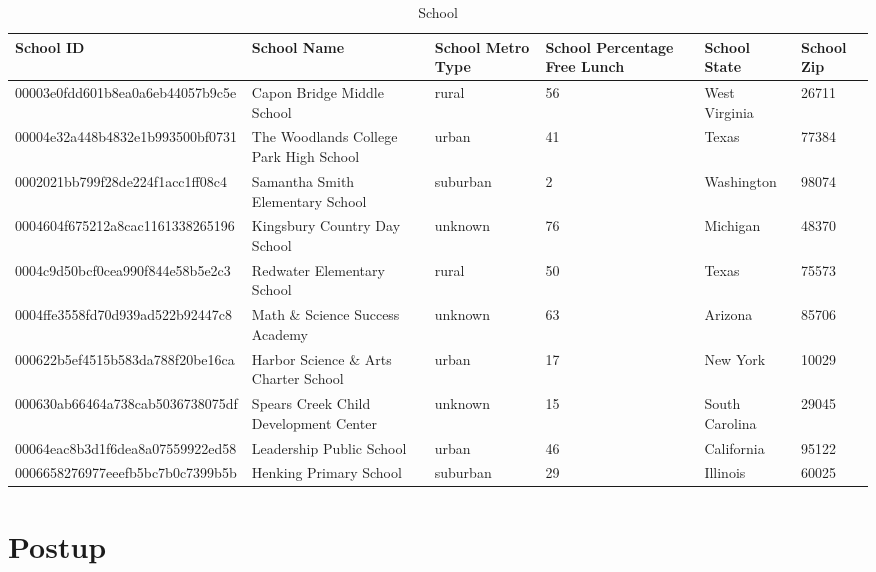 \documentclass[12pt,a4paper]{article}
\begin{document}
\begin{table}[htb]
\begin{tabularx}{1.05\textwidth}{XlXXXX}
School ID                        & School Name                            & School Metro Type & School Percentage Free Lunch & School State   & School Zip \\ \hline
00003e0fdd601b8ea0a6eb44057b9c5e & Capon Bridge Middle School             & rural             & 56                           & West Virginia  & 26711      \\
00004e32a448b4832e1b993500bf0731 & The Woodlands College Park High School & urban             & 41                           & Texas          & 77384      \\
0002021bb799f28de224f1acc1ff08c4 & Samantha Smith Elementary School       & suburban          & 2                            & Washington     & 98074      \\
0004604f675212a8cac1161338265196 & Kingsbury Country Day School           & unknown           & 76                           & Michigan       & 48370      \\
0004c9d50bcf0cea990f844e58b5e2c3 & Redwater Elementary School             & rural             & 50                           & Texas          & 75573      \\
0004ffe3558fd70d939ad522b92447c8 & Math \& Science Success Academy        & unknown           & 63                           & Arizona        & 85706      \\
000622b5ef4515b583da788f20be16ca & Harbor Science \& Arts Charter School  & urban             & 17                           & New York       & 10029      \\
000630ab66464a738cab5036738075df & Spears Creek Child Development Center  & unknown           & 15                           & South Carolina & 29045      \\
00064eac8b3d1f6dea8a07559922ed58 & Leadership Public School               & urban             & 46                           & California     & 95122      \\
0006658276977eeefb5bc7b0c7399b5b & Henking Primary School                 & suburban          & 29                           & Illinois       & 60025 
\end{tabularx}
\caption{School}
\end{table}

\section{Postup}
\end{document}

